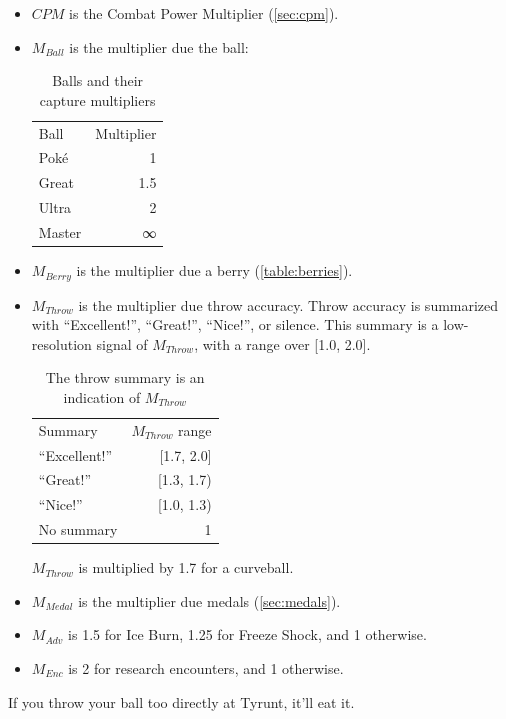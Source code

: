 \begin{itemize}
  \item $CPM$ is the Combat Power Multiplier (\autoref{sec:cpm}).
  \item $M_{Ball}$ is the multiplier due the ball:
\begin{table}[h!]
\centering
\begin{tabular}{lr}
Ball & Multiplier\\
\Midrule
Poké & 1\\
Great & 1.5\\
Ultra & 2\\
Master & ∞\\
\end{tabular}
\caption{Balls and their capture multipliers}
\label{table:balls}
\end{table}
\item $M_{Berry}$ is the multiplier due a berry (\autoref{table:berries}).
\item $M_{Throw}$ is the multiplier due throw accuracy. Throw accuracy is summarized
   with ``Excellent!'', ``Great!'', ``Nice!'', or silence.
    This summary is a low-resolution signal of $M_{Throw}$, with a range over [1.0, 2.0].
\begin{table}[h!]
\centering
\begin{tabular}{lr}
Summary & $M_{Throw}$ range\\
\Midrule
``Excellent!'' & [1.7, 2.0]\\
``Great!'' & [1.3, 1.7)\\
``Nice!'' & [1.0, 1.3)\\
No summary & 1\\
\end{tabular}
\caption{The throw summary is an indication of $M_{Throw}$}
\label{table:throw}
\end{table}
$M_{Throw}$ is multiplied by 1.7 for a curveball.
\item $M_{Medal}$ is the multiplier due medals (\autoref{sec:medals}).
\item $M_{Adv}$ is 1.5 for Ice Burn, 1.25 for Freeze Shock, and 1 otherwise.
\item $M_{Enc}$ is 2 for research encounters, and 1 otherwise.
\end{itemize}
If you throw your ball too directly at Tyrunt, it'll eat it.

